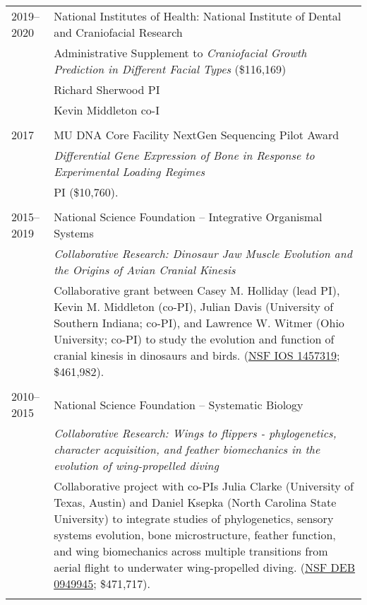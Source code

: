 \begin{longtable}{@{}lX@{}}
    2019--2020 & National Institutes of Health: National Institute of Dental and Craniofacial Research\\
    & Administrative Supplement to \emph{Craniofacial Growth Prediction in Different Facial Types} (\$116,169)\\
    & Richard Sherwood PI\\
    & Kevin Middleton co-I\\
    \\
    2017 & MU DNA Core Facility NextGen Sequencing Pilot Award\\
    & \emph{Differential Gene Expression of Bone in Response to Experimental Loading Regimes}\\
    & PI (\$10,760).\\
    \\
    2015--2019 & National Science Foundation -- Integrative Organismal Systems\\
    & \emph{Collaborative Research: Dinosaur Jaw Muscle Evolution and the Origins of Avian Cranial Kinesis}\\[0.5pc]
    & Collaborative grant between Casey M. Holliday (lead PI), Kevin M. Middleton (co-PI), Julian Davis (University of Southern Indiana; co-PI), and Lawrence W. Witmer (Ohio University; co-PI) to study the evolution and function of cranial kinesis in dinosaurs and birds. (\href{https://www.nsf.gov/awardsearch/showAward?AWD_ID=1457319}{NSF IOS 1457319}; \$461,982).\\
    \\
    2010--2015 & National Science Foundation -- Systematic Biology\\
    & \textit{Collaborative Research: Wings to flippers - phylogenetics, character acquisition, and feather biomechanics in the evolution of wing-propelled diving}\\[0.5pc]
    & Collaborative project with co-PIs Julia Clarke (University of Texas, Austin) and Daniel Ksepka (North Carolina State University) to integrate studies of phylogenetics, sensory systems evolution, bone microstructure, feather function, and wing biomechanics across multiple transitions from aerial flight to underwater wing-propelled diving. (\href{http://www.nsf.gov/awardsearch/showAward.do?AwardNumber=0949945}{NSF DEB 0949945}; \$471,717).\\
    \\

\end{longtable}
